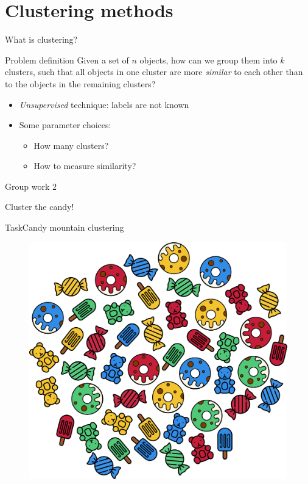 \documentclass[aspectratio=169]{beamer}
\begin{document}
  \section{Clustering methods}

  \begin{frame}{What is clustering?}

    \begin{block}{Problem definition}
      Given a set of $n$ objects, how can we group them into $k$
      clusters, such that all objects in one cluster are more
      \emph{similar} to each other than to the objects in the
      remaining clusters?
    \end{block}

    \vfill

    \begin{itemize}
      \item \emph{Unsupervised} technique: labels are not known
      \item Some parameter choices:
        \begin{itemize}
          \item How many clusters?
          \item How to measure similarity?
        \end{itemize}
    \end{itemize}
  \end{frame}

  \begin{frame}{Group work 2}
    \begin{center}
      \begin{huge}
        Cluster the candy!
      \end{huge}
    \end{center}
  \end{frame}

  \begin{frame}{Task}{Candy mountain clustering}
    \begin{figure}
      \includegraphics[width=0.50\linewidth]{Figures/Candy_mountain}
    \end{figure}
  \end{frame}
\end{document}
